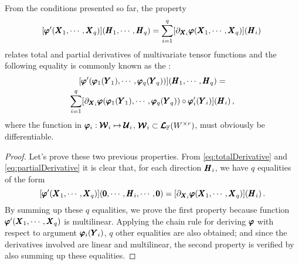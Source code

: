 From the conditions presented so far, the property 
\begin{equation}
[\pmb{\varphi}'(\pmb{X}_1,\cdots,\pmb{X}_q)](\pmb{H}_1,\cdots,\pmb{H}_q)=\sum_{i=1}^{q}[\partial_{\pmb{X}_i}\pmb{\varphi}(\pmb{X}_1,\cdots,\pmb{X}_q)]{(\pmb{H}_i)}\,
\end{equation}
relates total and partial derivatives of multivariate tensor functions and the following equality is commonly known as the :
\begin{multline}\label{eq:chainRulePartial}
[\pmb{\varphi}'(\pmb{\varphi}_1(\pmb{Y}_1),\cdots,\pmb{\varphi}_q(\pmb{Y}_q))](\pmb{H}_1,\cdots,\pmb{H}_q)=\\
\sum_{i=1}^{q}[\partial_{\pmb{X}_i}\pmb{\varphi}(\pmb{\varphi}_1(\pmb{Y}_1),\cdots,\pmb{\varphi}_q(\pmb{Y}_q))\circ\pmb{\varphi}_i'(\pmb{Y}_i)]{(\pmb{H}_i)}\,,
\end{multline}
where the function in $\pmb{\varphi}_i : {\pmb{\mathcal{W}}_i} \mapsto \pmb{\mathcal{U}}_i$, ${\pmb{\mathcal{W}}_i}\subset\pmb{\mathcal{L}}_{\mathbb{F}}(W^{\times r})$, must obviously be differentiable.

{\footnotesize
\begin{proof}
Let's prove these two previous properties. From \eqref{eq:totalDerivative} and \eqref{eq:partialDerivative} it is clear that, for each direction $\pmb{H}_i$, we have $q$ equalities of the form
\begin{equation*}
[\pmb{\varphi}'(\pmb{X}_1,\cdots,\pmb{X}_q)](\pmb{0},\cdots,\pmb{H}_i,\cdots,\pmb{0})=[\partial_{\pmb{X}_i}\pmb{\varphi}(\pmb{X}_1,\cdots,\pmb{X}_q)]{(\pmb{H}_i)}\,.
\end{equation*}
By summing up these $q$ equalities, we prove the first property because function $\pmb{\varphi}'(\pmb{X}_1,\cdots,\pmb{X}_q)$ is multilinear. Applying the chain rule for deriving $\pmb{\varphi}$ with respect to argument $\pmb{\varphi}_i(\pmb{Y}_i)$,  $q$ other equalities are also obtained; and since the derivatives involved are linear and multilinear, the second property is verified by also summing up these equalities. 
\end{proof}}

